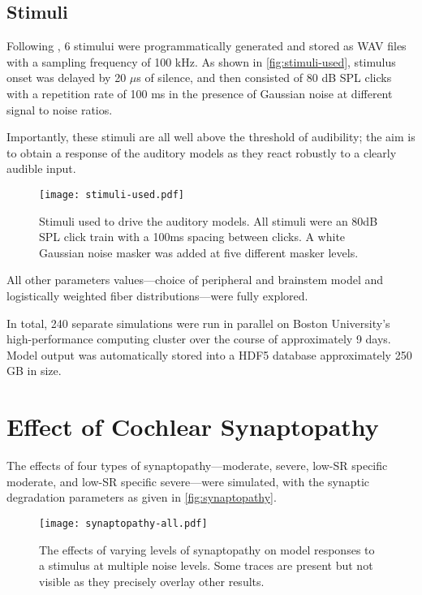 \subsection{Stimuli} %
\label{sub:stimuli}
Following \citeauthor{Mehraei2015Auditory,Mehraei2016Auditory}, 6 stimului were programmatically generated and stored as WAV files with a sampling frequency of 100 kHz.  As shown in \autoref{fig:stimuli-used}, stimulus onset was delayed by 20 $\mu$s of silence, and then consisted of 80 dB SPL clicks with a repetition rate of 100 ms in the presence of Gaussian noise at different signal to noise ratios. 

Importantly, these stimuli are all well above the threshold of audibility; the aim is to obtain a response of the auditory models as they react robustly to a clearly audible input. 

\begin{figure}[htbp]
	\centering
	\texttt{[image: stimuli-used.pdf]}
	\caption[Experimental Stimuli]{Stimuli used to drive the auditory models.  All stimuli were an 80dB SPL click train with a 100ms spacing between clicks.  A white Gaussian noise masker was added at five different masker levels.}
	\label{fig:stimuli-used}
\end{figure}

All other parameters values---choice of peripheral and brainstem model and logistically weighted fiber distributions---were fully explored.

In total, 240 separate simulations were run in parallel on Boston University's high-performance computing cluster over the course of approximately 9 days.  Model output was automatically stored into a HDF5 database approximately 250 GB in size.



\section{Effect of Cochlear Synaptopathy} %
\label{sec:effect_of_synaptopathy}
The effects of four types of synaptopathy---moderate, severe, low-SR specific moderate, and low-SR specific severe---were simulated, with the synaptic degradation parameters as given in \autoref{fig:synaptopathy}. 

\begin{figure}[htbp]
	\centering
	\texttt{[image: synaptopathy-all.pdf]}
	\caption[Effects of Synaptopathy]{The effects of varying levels of synaptopathy on model responses to a stimulus at multiple noise levels.  Some traces are present but not visible as they precisely overlay other results.}
	\label{fig:synaptopathy_results}
\end{figure}


